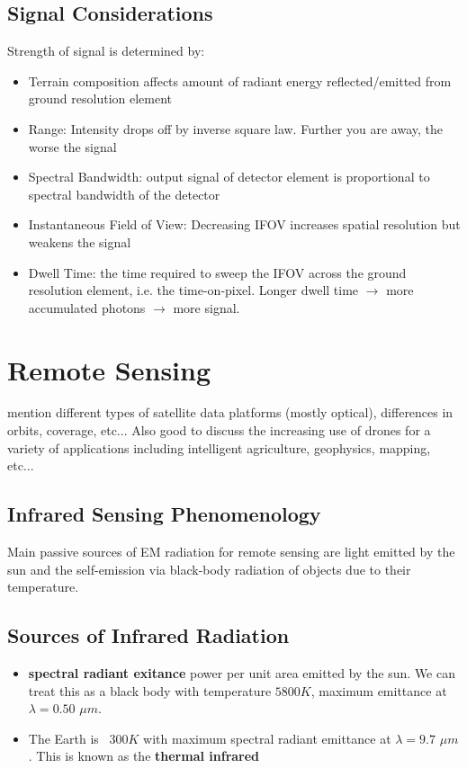 \subsection{Signal Considerations}
Strength of signal is determined by:
\begin{itemize}
  \item Terrain composition affects amount of radiant energy reflected/emitted from ground resolution element
  \item Range: Intensity drops off by inverse square law. Further you are away, the worse the signal
  \item Spectral Bandwidth: output signal of detector element is proportional to spectral bandwidth of the detector
  \item Instantaneous Field of View: Decreasing IFOV increases spatial resolution but weakens the signal
  \item Dwell Time: the time required to sweep the IFOV across the ground resolution element, i.e. the time-on-pixel. Longer dwell time $\to$ more accumulated photons $\to$ more signal.
\end{itemize}






\section{Remote Sensing}

mention different types of satellite data platforms (mostly optical), differences in orbits, coverage, etc... Also good to discuss the increasing use of drones for a variety of applications including intelligent agriculture, geophysics, mapping, etc...



\subsection{Infrared Sensing Phenomenology}

Main passive sources of EM radiation for remote sensing are light emitted by the sun and the self-emission via black-body radiation of objects due to their temperature.

\subsection{Sources of Infrared Radiation}
\begin{itemize}
\item \textbf{spectral radiant exitance} power per unit area emitted by the sun. We can treat this as a black body with temperature $5800 K$, maximum emittance at $\lambda = 0.50$ $\mu m$.
\item The Earth is ~$300 K$ with maximum spectral radiant emittance at $\lambda = 9.7$ $\mu m$. This is known as the \textbf{thermal infrared}
\end{itemize}

